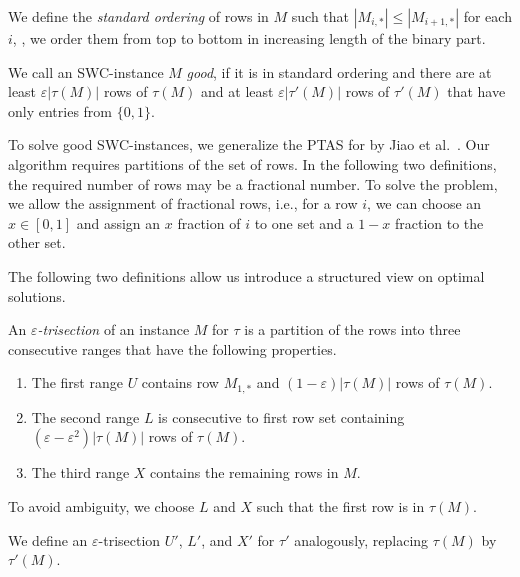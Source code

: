 \begin{definition}
    We define the \emph{standard ordering} of rows in $M$ such that $|M_{i,*}| \le |M_{i+1,*}|$ for each $i$, \ie, we order them from top to bottom in increasing length of the binary part. 
    \label{def:order-SWC}
\end{definition}

\begin{definition}
    \label{def:good-SWC}
    We call an SWC-instance $M$ \emph{good}, if it is in standard ordering and there are at least $\varepsilon |\tau(M)|$ rows of $\tau(M)$ and at least $\varepsilon |\tau'(M)|$ rows of $\tau'(M)$ that have only entries from $\{0,1\}$.
\end{definition}

To solve good SWC-instances, we generalize the PTAS for \BMEC by Jiao et al.~\cite{JXL04_k}. 
Our algorithm requires partitions of the set of rows.
In the following two definitions, the required number of rows may be a fractional number. 
To solve the problem, we allow the assignment of fractional rows, i.e., for a row $i$, we can choose an $x \in [0,1]$ and assign an $x$ fraction of $i$ to one set and a $1-x$ fraction to the other set. 

The following two definitions allow us introduce a structured view on optimal solutions.
\begin{definition}[Trisection]
    An \emph{$\varepsilon$-trisection} of an instance $M$ for $\tau$ is a partition of the rows into three consecutive ranges that have the following properties.
    \begin{enumerate}
        \item The first range $U$ contains row $M_{1,*}$ and $(1-\varepsilon) |\tau(M)|$ rows of $\tau(M)$.
        \item The second range $L$ is consecutive to first row set containing $(\varepsilon - \varepsilon^2)|\tau(M)|$ rows of $\tau(M)$.
        \item The third range $X$ contains the remaining rows in $M$.
    \end{enumerate}
    To avoid ambiguity, we choose $L$ and $X$ such that the first row is in $\tau(M)$.

    We define an $\varepsilon$-trisection $U'$, $L'$, and $X'$ for $\tau'$ analogously, replacing $\tau(M)$ by $\tau'(M)$.
    \label{def:trisection}
\end{definition}

